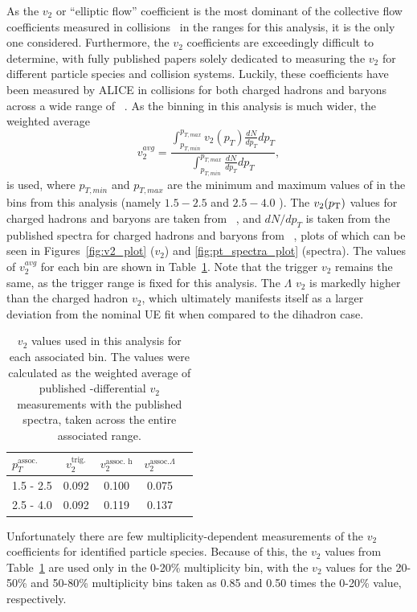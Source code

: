 As the $v_{2}$ or ``elliptic flow'' coefficient is the most dominant of the collective flow coefficients measured in \pPb collisions~\cite{Justin111} in the \pt ranges for this analysis, it is the only one considered. Furthermore, the $v_{2}$ coefficients are exceedingly difficult to determine, with fully published papers solely dedicated to measuring the $v_{2}$ for different particle species and collision systems. Luckily, these coefficients have been measured by ALICE in \pPb collisions for both charged hadrons and \lmb baryons across a wide range of \pt~\cite{ALICEv2_1, ALICEv2_2}. As the \pt binning in this analysis is much wider, the weighted average 
%
\begin{equation}
    \label{eq:v2_weighted_average}
    v_{2}^{avg} = \frac{\int_{p_{T, min}}^{p_{T, max}}v_{2}(p_{T})\frac{dN}{dp_{T}}dp_{T}}{\int_{p_{T, min}}^{p_{T, max}}\frac{dN}{dp_{T}}dp_{T}},
\end{equation}
%
is used, where $p_{T, min}$ and $p_{T, max}$ are the minimum and maximum values of \pt in the bins from this analysis (namely $1.5 - 2.5$ and $2.5 - 4.0$ \GeVc). The $v_{2}(p_{\text{T}})$ values for charged hadrons and \lmb baryons are taken from ~\cite{ALICEv2_1}, and $dN/dp_{T}$ is taken from the published \pt spectra for charged hadrons and \lmb baryons from ~\cite{PtSpectra}, plots of which can be seen in Figures~\ref{fig:v2_plot} ($v_{2}$) and \ref{fig:pt_spectra_plot} (\pt spectra). The values of $v_{2}^{avg}$ for each \pt bin are shown in Table~\ref{tab:v2_values}. Note that the trigger $v_{2}$ remains the same, as the trigger \pt range is fixed for this analysis. The $\Lambda$ $v_{2}$ is markedly higher than the charged hadron $v_{2}$, which ultimately manifests itself as a larger deviation from the nominal UE fit when compared to the dihadron case.
%
\begin{table}[t]
    \centering
    \caption{$v_{2}$ values used in this analysis for each associated \pt bin. The values were calculated as the weighted average of published \pt-differential $v_{2}$ measurements with the published \pt spectra, taken across the entire associated \pt range.}
    \label{tab:v2_values}
    \begin{tabular}{ l c c c c }
    \hline
    $p_{T}^{\text{assoc.}}$ & $v_{2}^{\text{trig.}}$ & $v_{2}^{\text{assoc. h}}$ & $v_{2}^{\text{assoc.} \Lambda}$ \\
    \hline
    1.5 - 2.5 & 0.092 & 0.100 & 0.075 \\
    2.5 - 4.0 & 0.092 & 0.119 & 0.137 \\
    \hline
    \end{tabular}
\end{table}
%
Unfortunately there are few multiplicity-dependent measurements of the $v_{2}$ coefficients for identified particle species. Because of this, the $v_{2}$ values from Table~\ref{tab:v2_values} are used only in the 0-20\% multiplicity bin, with the $v_{2}$ values for the 20-50\% and 50-80\% multiplicity bins taken as 0.85 and 0.50 times the 0-20\% value, respectively.

